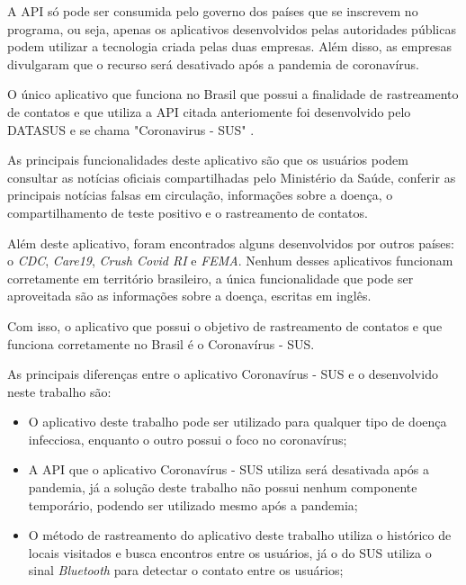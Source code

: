 A API só pode ser consumida pelo governo dos países que se inscrevem no programa, ou seja, apenas os aplicativos desenvolvidos pelas autoridades públicas podem utilizar a tecnologia criada pelas duas empresas. Além disso, as empresas divulgaram que o recurso será desativado após a pandemia de coronavírus.

O único aplicativo que funciona no Brasil que possui a finalidade de rastreamento de contatos e que utiliza a API citada anteriomente foi desenvolvido pelo DATASUS e se chama "Coronavirus - SUS"  \cite{CoronavirusSUS}.

As principais funcionalidades deste aplicativo são que os usuários podem consultar as notícias oficiais compartilhadas pelo Ministério da Saúde, conferir as principais notícias falsas em circulação, informações sobre a doença, o compartilhamento de teste positivo e o rastreamento de contatos.

Além deste aplicativo, foram encontrados alguns desenvolvidos por outros países: o \textit{CDC}, \textit{Care19}, \textit{Crush Covid RI} e \textit{FEMA}. Nenhum desses aplicativos funcionam corretamente em território brasileiro, a única funcionalidade que pode ser aproveitada são as informações sobre a doença, escritas em inglês.

Com isso, o aplicativo que possui o objetivo de rastreamento de contatos e que funciona corretamente no Brasil é o Coronavírus - SUS.

As principais diferenças entre o aplicativo Coronavírus - SUS e o desenvolvido neste trabalho são: 
\begin{itemize}
    \item O aplicativo deste trabalho pode ser utilizado para qualquer tipo de doença infecciosa, enquanto o outro possui o foco no coronavírus;
    \item A API que o aplicativo Coronavírus - SUS utiliza será desativada após a pandemia, já a solução deste trabalho não possui nenhum componente temporário, podendo ser utilizado mesmo após a pandemia;
    \item O método de rastreamento do aplicativo deste trabalho utiliza o histórico de locais visitados e busca encontros entre os usuários, já o do SUS utiliza o sinal \textit{Bluetooth} para detectar o contato entre os usuários;
\end{itemize}
